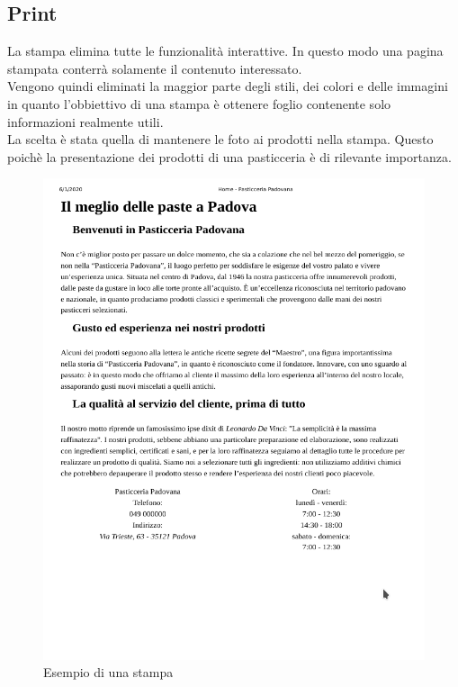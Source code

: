\subsection{Print}
La stampa elimina tutte le funzionalità interattive. In questo modo una pagina stampata conterrà solamente il contenuto interessato.\\
Vengono quindi eliminati la maggior parte degli stili, dei colori e delle immagini in quanto l'obbiettivo di una stampa è ottenere foglio 
contenente solo informazioni realmente utili.\\
La scelta è stata quella di mantenere le foto ai prodotti nella stampa. Questo poichè la presentazione dei prodotti di una pasticceria è di rilevante importanza.\\
\begin{figure}[!h]
    \centering		  
	\includegraphics[width=0.8\linewidth]{sezioni/Progettazione/Immagini/print_example.png}
	\caption{Esempio di una stampa}
	\label{Fig:verPrint}
\end{figure}


\newpage